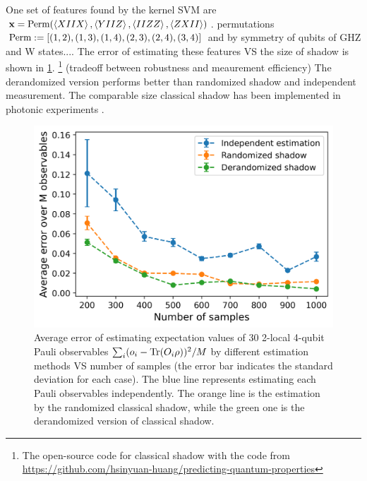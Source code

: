 \documentclass[
aps,
pra,
twocolumn,
floatfix,
]{revtex4-2}
\theoremstyle{plain}
\theoremstyle{definition}
\newcommand{\ob}{O}
\newcommand{\dm}{\rho}
\newcommand{\perm}{\textup{Perm}}
\begin{document}
One set of features found by the kernel SVM are 
$\vbx=\perm(\expval{XIIX},\expval{YIIZ},\expval{IIZZ},\expval{ZXII})$.
permutations $\perm:=[(1,2),(1,3),(1,4),(2,3),(2,4),(3,4)]$ and by symmetry of qubits of GHZ and W states....
The error of estimating these features VS the size of shadow is shown in \cref{fig:shadow}.
\footnote{The open-source code for classical shadow with the code from \url{https://github.com/hsinyuan-huang/predicting-quantum-properties}}
(tradeoff between robustness and meaurement efficiency) 
The derandomized version performs better than randomized shadow and independent measurement.
The comparable size classical shadow has been implemented in photonic experiments  \cite{zhangExperimentalQuantumState2021}.
\begin{figure}[!ht]
	\centering
	\includegraphics[width=.9\linewidth]{./Code/estimation_error_compare_methods.png}
	\caption{Average error of estimating expectation values of 30 2-local 4-qubit Pauli observables $\sum_i (o_i-\Tr(\ob_i\dm))^2/M$ by different estimation methods VS number of samples (the error bar indicates the standard deviation for each case). The blue line represents estimating each Pauli observables independently. The orange line is the estimation by the randomized classical shadow, while the green one is the derandomized version of classical shadow.}
	\label{fig:shadow}
\end{figure}

\end{document}
